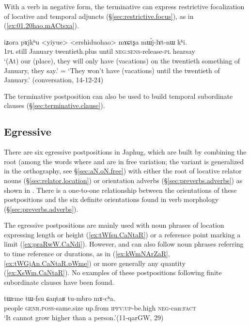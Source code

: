 With a verb in negative form, the terminative can express restrictive focalization of locative and temporal adjuncts (§\ref{sec:restrictive.focus}), as in (\ref{ex:01.20hao.mACtsxa}).

\begin{exe}
\ex \label{ex:01.20hao.mACtsxa}
 \gll  iʑora pɤjkʰu <yiyue> <ershiduohao> mɤɕtʂa mɯ́j-lɤt-nɯ kʰi. \\
 \textsc{1pl} still January twentieth.plus until \textsc{neg}:\textsc{sens}-release-\textsc{pl} hearsay \\
 \glt `(At) our (place), they will only have (vacations) on the twentieth something of January, they say.' = `They won't have (vacations) until the twentieth of January.' (conversation, 14-12-24)
 \end{exe}
 
The terminative postposition  can also be used to build temporal subordinate clauses (§\ref{sec:terminative.clause}).

\subsection{Egressive} \label{sec:egressive}  
There are six egressive postpositions in Japhug, which are built by combining the root  (among the words where  and  are in free variation; the variant  is generalized in the orthography,  see §\ref{sec:aN.oN.free}) with either the root of locative relator nouns (§\ref{sec:relator.location}) or orientation adverbs (§\ref{sec:preverbs.adverbs}) as shown in . There is a one-to-one relationship between the orientations of these postpositions and the six definite orientations found in verb morphology (§\ref{sec:preverbs.adverbs}).

The egressive postpositions are mainly used with noun phrases of location expressing length or height (\ref{ex:tWfsu.CaNtaR}) or a reference point marking a limit (\ref{ex:praRwW.CaNdi}). However,  and  can also follow noun phrases referring to time reference or durations, as in (\ref{ex:kWmNArZaR}, \ref{ex:tWGjAn.CaNtaR.pWme}) or more generally any quantity (\ref{ex:XsWm.CaNtaR}). No examples of these postpositions following finite subordinate clauses have been found.


\begin{exe}
\ex \label{ex:tWfsu.CaNtaR}
 \gll tɯrme tɯ-fsu ɕaŋtaʁ tu-mbro mɤ-cʰa. \\
people \textsc{genr}.\textsc{poss}-same.size up.from \textsc{ipfv}:\textsc{up}-be.high \textsc{neg}-can:\textsc{fact} \\
\glt `It cannot grow higher than a person.'(11-qarGW, 29)
\end{exe}
 
